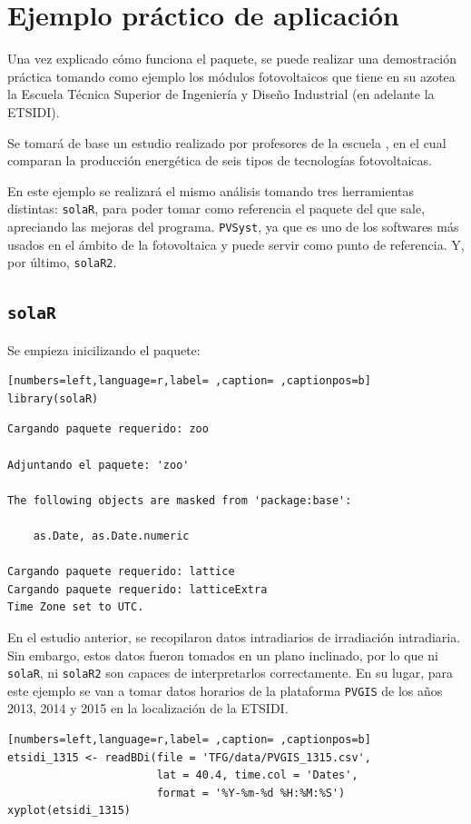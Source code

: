 \chapter{Ejemplo práctico de aplicación}
\label{chap:ejemplo-practico-aplicacion}
Una vez explicado cómo funciona el paquete, se puede realizar una demostración práctica tomando como ejemplo los módulos fotovoltaicos que tiene en su azotea la Escuela Técnica Superior de Ingeniería y Diseño Industrial (en adelante la ETSIDI).

Se tomará de base un estudio realizado por profesores de la escuela \cite{adrada17}, en el cual comparan la producción energética de seis tipos de tecnologías fotovoltaicas.

En este ejemplo se realizará el mismo análisis tomando tres herramientas distintas: \texttt{solaR}, para poder tomar como referencia el paquete del que sale, apreciando las mejoras del programa. \texttt{PVSyst}, ya que es uno de los softwares más usados en el ámbito de la fotovoltaica y puede servir como punto de referencia. Y, por último, \texttt{solaR2}.

\section{\texttt{solaR}}
\label{sec:orgf0b76bb}
\label{sec:solaR}
Se empieza inicilizando el paquete:
\begin{lstlisting}[numbers=left,language=r,label= ,caption= ,captionpos=b]
library(solaR)
\end{lstlisting}

\begin{verbatim}
Cargando paquete requerido: zoo

Adjuntando el paquete: 'zoo'

The following objects are masked from 'package:base':

    as.Date, as.Date.numeric

Cargando paquete requerido: lattice
Cargando paquete requerido: latticeExtra
Time Zone set to UTC.
\end{verbatim}

En el estudio anterior, se recopilaron datos intradiarios de irradiación intradiaria. Sin embargo, estos datos fueron tomados en un plano inclinado, por lo que ni \texttt{solaR}, ni \texttt{solaR2} son capaces de interpretarlos correctamente. En su lugar, para este ejemplo se van a tomar datos horarios de la plataforma \texttt{PVGIS} \cite{pvgis} de los años 2013, 2014 y 2015 en la localización de la ETSIDI.
\begin{lstlisting}[numbers=left,language=r,label= ,caption= ,captionpos=b]
etsidi_1315 <- readBDi(file = 'TFG/data/PVGIS_1315.csv',
                       lat = 40.4, time.col = 'Dates',
                       format = '%Y-%m-%d %H:%M:%S')
xyplot(etsidi_1315)
\end{lstlisting}

